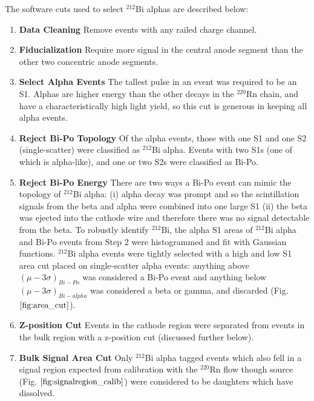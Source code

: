 The software cuts used to select $^{212}$Bi alphas are described below: 
\begin{enumerate}
\item \textbf{Data Cleaning} Remove events with any railed charge channel.
\item \textbf{Fiducialization} Require more signal in the central anode segment than the other two concentric anode segments.
\item \textbf{Select Alpha Events} The tallest pulse in an event was required to be an S1. Alphas are higher energy than the other decays in the $^{220}$Rn chain, and have a characteristically high light yield, so this cut is generous in keeping all alpha events.
\item \textbf{Reject Bi-Po Topology} Of the alpha events, those with one S1 and one S2 (single-scatter) were classified as $^{212}$Bi alpha. Events with two S1s (one of which is alpha-like), and one or two S2s were classified as Bi-Po.
\item \textbf{Reject Bi-Po Energy} There are two ways a Bi-Po event can mimic the topology of $^{212}$Bi alpha: (i) alpha decay was prompt and so the scintillation signals from the beta and alpha were combined into one large S1 (ii) the beta was ejected into the cathode wire and therefore there was no signal detectable from the beta. To robustly identify $^{212}$Bi, the alpha S1 areas of $^{212}$Bi alpha and Bi-Po events from Step 2 were histogrammed and fit with Gaussian functions. $^{212}$Bi alpha events were tightly selected with a high and low S1 area cut placed on single-scatter alpha events: anything above $(\mu - 3\sigma)_{Bi-Po}$ was considered a Bi-Po event and anything below $(\mu - 3\sigma)_{Bi-alpha}$ was considered a beta or gamma, and discarded (Fig. $\ref{fig:area_cut}$). 
\item \textbf{Z-position Cut} Events in the cathode region were separated from events in the bulk region with a z-position cut (discussed further below).
\item \textbf{Bulk Signal Area Cut} Only $^{212}$Bi alpha tagged events which also fell in a signal region expected from calibration with the $^{220}$Rn flow though source (Fig. $\ref{fig:signalregion_calib}$) were considered to be daughters which have dissolved.
\end{enumerate}





